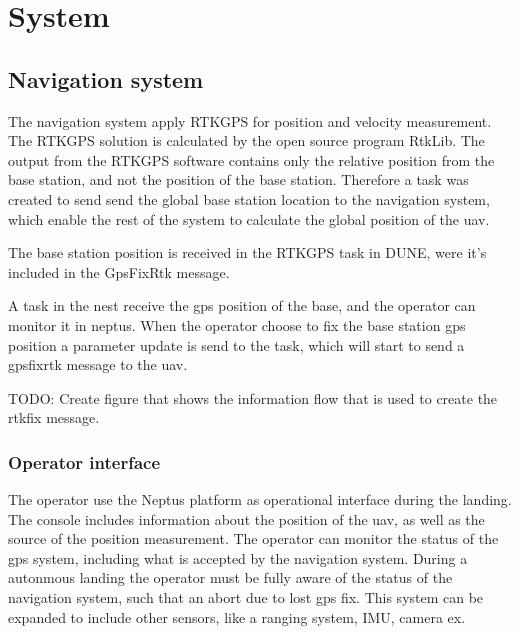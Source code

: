 \chapter{System}

\section{Navigation system}
The navigation system apply RTKGPS for position and velocity measurement. The RTKGPS solution is calculated by the open source program RtkLib. The output from the RTKGPS software contains only the relative position from the base station, and not the position of the base station. Therefore a task was created to send send the global base station location to the navigation system, which enable the rest of the system to calculate the global position of the uav. 

The base station position is received in the RTKGPS task in DUNE, were it's included in the GpsFixRtk message.

A task in the nest receive the gps position of the base, and the operator can monitor it in neptus. When the operator choose to fix the base station gps position a parameter update is send to the task, which will start to send a gpsfixrtk message to the uav. 

TODO: Create figure that shows the information flow that is used to create the rtkfix message.
\subsection{Operator interface}
The operator use the Neptus platform as operational interface during the landing. The console includes information about the position of the uav, as well as the source of the position measurement. The operator can monitor the status of the gps system, including what is accepted by the navigation system. During a autonmous landing the operator must be fully aware of the status of the navigation system, such that an abort due to lost gps fix. This system can be expanded to include other sensors, like a ranging system, IMU, camera ex.
